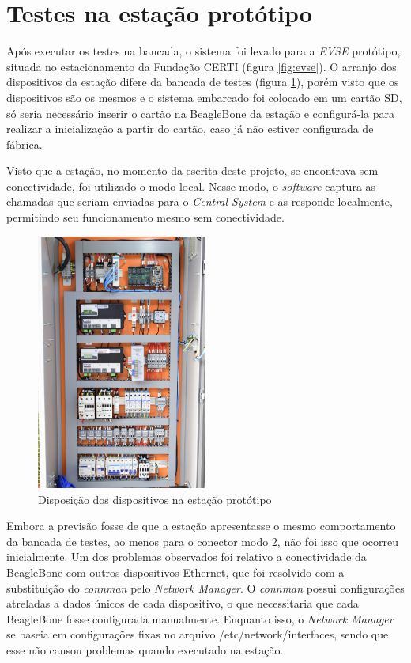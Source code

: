   \section{Testes na estação protótipo}
  \label{tests:evse}

    Após executar os testes na bancada, o sistema foi levado para a \textit{\ac{EVSE}} protótipo, situada no estacionamento da Fundação CERTI (figura \ref{fig:evse}). O arranjo dos dispositivos da estação difere da bancada de testes (figura \ref{fig:setup-evse}), porém visto que os dispositivos são os mesmos e o sistema embarcado foi colocado em um cartão SD, só seria necessário inserir o cartão na BeagleBone da estação e configurá-la para realizar a inicialização a partir do cartão, caso já não estiver configurada de fábrica.

    Visto que a estação, no momento da escrita deste projeto, se encontrava sem conectividade, foi utilizado o modo local. Nesse modo, o \textit{software} captura as chamadas que seriam enviadas para o \textit{Central System} e as responde localmente, permitindo seu funcionamento mesmo sem conectividade. 

    \begin{figure}[H]
      \begin{center}
        \includegraphics[width=0.5\textwidth,natwidth=1420,natheight=2130]{assets/images/setup-evse.jpg}
        \caption{Disposição dos dispositivos na estação protótipo}
        \label{fig:setup-evse}
      \end{center}
    \end{figure}

    Embora a previsão fosse de que a estação apresentasse o mesmo comportamento da bancada de testes, ao menos para o conector modo 2, não foi isso que ocorreu inicialmente. Um dos problemas observados foi relativo a conectividade da BeagleBone com outros dispositivos Ethernet, que foi resolvido com a substituição do \textit{connman} pelo \textit{Network Manager}. O \textit{connman} possui configurações atreladas a dados únicos de cada dispositivo, o que necessitaria que cada BeagleBone fosse configurada manualmente. Enquanto isso, o \textit{Network Manager} se baseia em configurações fixas no arquivo /etc/network/interfaces, sendo que esse não causou problemas quando executado na estação.

